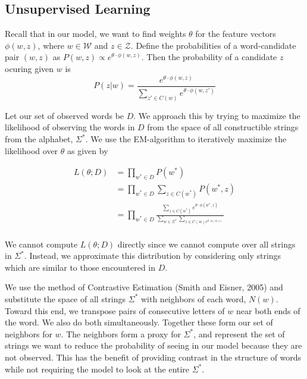\documentclass[11pt,twocolumn]{article}
\begin{document}
\subsection{Unsupervised Learning}
Recall that in our model, we want to find weights $\theta$ for the feature vectors $\phi(w,z)$, where $w\in\mathcal W$ and $z\in\mathcal Z$. Define the probabilities of a word-candidate pair $(w,z)$ as $P(w,z)\propto e^{\theta\cdot\phi(w,z)}$. Then the probability of a candidate $z$ ocuring given $w$ is
\begin{equation}
    \label{equ:prob_par}
    P(z|w) = \frac{e^{\theta\cdot\phi(w,z)}} {\sum_{z'\in C(w)} e^{\theta\cdot\phi(w,z')}}
\end{equation}

Let our set of observed words be $D$. We approach this by trying to maximize the likelihood of observing the words in $D$ from the space of all constructible strings from the alphabet, $\Sigma^*$. We use the EM-algorithm to iteratively maximize the likelihood over $\theta$ as given by

\begin{equation}
    \begin{split}
        L(\theta; D) &= \prod_{w^*\in D} P(w^*) \\
        &= \prod_{w^*\in D} \sum_{z\in C(w^*)} P(w^*, z) \\
        &= \prod_{w^*\in D} \frac{\sum_{z\in C(w^*)} e^{\theta\cdot\phi(w^*,z)}} {\sum_{w\in\Sigma^*}\sum_{z\in C(w) e^{\theta\cdot\phi(w,z)}}} \\
    \end{split}
\end{equation}

We cannot compute $L(\theta; D)$ directly since we cannot compute over all strings in $\Sigma^*$. Instead, we approximate this distribution by considering only strings which are similar to those encountered in $D$.

We use the method of Contrastive Estimation (Smith and Eisner, 2005) and substitute the space of all strings $\Sigma^*$ with neighbors of each word, $N(w)$. Toward this end, we transpose pairs of consecutive letters of $w$ near both ends of the word. We also do both simultaneously. Together these form our set of neighbors for $w$. The neighbors form a proxy for $\Sigma^*$, and represent the set of strings we want to reduce the probability of seeing in our model because they are not observed. This has the benefit of providing contrast in the structure of words while not requiring the model to look at the entire $\Sigma^*$.
\end{document}

